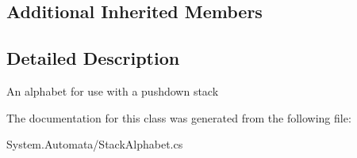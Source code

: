 \subsection*{Additional Inherited Members}


\subsection{Detailed Description}
An alphabet for use with a pushdown stack 



The documentation for this class was generated from the following file\+:\begin{DoxyCompactItemize}
\item 
System.\+Automata/Stack\+Alphabet.\+cs\end{DoxyCompactItemize}
